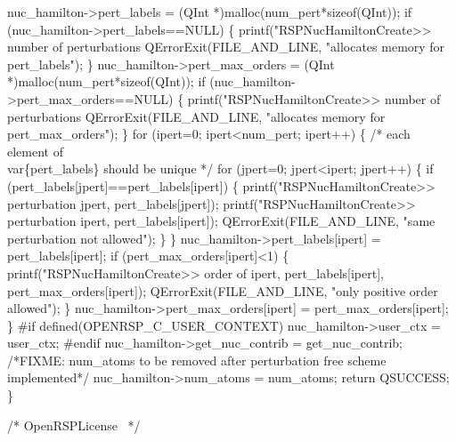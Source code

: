     nuc_hamilton->pert_labels = (QInt *)malloc(num_pert*sizeof(QInt));
    if (nuc_hamilton->pert_labels==NULL) \{
        printf("RSPNucHamiltonCreate>> number of perturbations %
        QErrorExit(FILE_AND_LINE, "allocates memory for pert_labels");
    \}
    nuc_hamilton->pert_max_orders = (QInt *)malloc(num_pert*sizeof(QInt));
    if (nuc_hamilton->pert_max_orders==NULL) \{
        printf("RSPNucHamiltonCreate>> number of perturbations %
        QErrorExit(FILE_AND_LINE, "allocates memory for pert_max_orders");
    \}
    for (ipert=0; ipert<num_pert; ipert++) \{
        /* each element of \\var\{pert_labels\} should be unique */
        for (jpert=0; jpert<ipert; jpert++) \{
            if (pert_labels[jpert]==pert_labels[ipert]) \{
                printf("RSPNucHamiltonCreate>> perturbation %
                       jpert,
                       pert_labels[jpert]);
                printf("RSPNucHamiltonCreate>> perturbation %
                       ipert,
                       pert_labels[ipert]);
                QErrorExit(FILE_AND_LINE, "same perturbation not allowed");
            \}
        \}
        nuc_hamilton->pert_labels[ipert] = pert_labels[ipert];
        if (pert_max_orders[ipert]<1) \{
            printf("RSPNucHamiltonCreate>> order of %
                   ipert,
                   pert_labels[ipert],
                   pert_max_orders[ipert]);
            QErrorExit(FILE_AND_LINE, "only positive order allowed");
        \}
        nuc_hamilton->pert_max_orders[ipert] = pert_max_orders[ipert];
    \}
#if defined(OPENRSP_C_USER_CONTEXT)
    nuc_hamilton->user_ctx = user_ctx;
#endif
    nuc_hamilton->get_nuc_contrib = get_nuc_contrib;
/*FIXME: num_atoms to be removed after perturbation free scheme implemented*/
    nuc_hamilton->num_atoms = num_atoms;
    return QSUCCESS;
\}

\nwendcode{}\endmoddef
/*
  \LA{}OpenRSPLicense~{\nwtagstyle{}}\RA{}
*/

